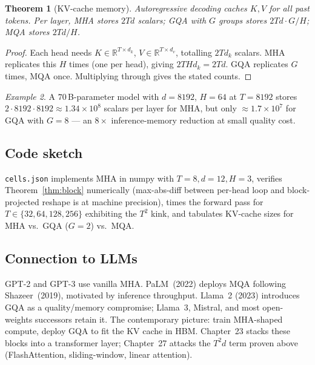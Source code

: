 \documentclass[11pt]{article}
\newtheorem{theorem}{Theorem}[section]
\theoremstyle{remark}
\newtheorem{example}[theorem]{Example}
\begin{document}
\begin{theorem}[KV-cache memory]
\label{thm:kvcache}
Autoregressive decoding caches $K, V$ for all past tokens. Per layer, MHA stores $2 T d$ scalars; GQA with $G$ groups stores $2 T d \cdot G/H$; MQA stores $2 T d / H$.
\end{theorem}
\begin{proof}
Each head needs $K \in \mathbb{R}^{T \times d_k}$, $V \in \mathbb{R}^{T \times d_v}$, totalling $2 T d_k$ scalars. MHA replicates this $H$ times (one per head), giving $2 T H d_k = 2 T d$. GQA replicates $G$ times, MQA once. Multiplying through gives the stated counts.
\end{proof}

\begin{example}
A $70$\,B-parameter model with $d = 8192$, $H = 64$ at $T = 8192$ stores $2 \cdot 8192 \cdot 8192 \approx 1.34 \times 10^{8}$ scalars per layer for MHA, but only $\approx 1.7 \times 10^{7}$ for GQA with $G = 8$ --- an $8\times$ inference-memory reduction at small quality cost.
\end{example}

\subsection*{Code sketch}

\texttt{cells.json} implements MHA in numpy with $T = 8, d = 12, H = 3$, verifies Theorem~\ref{thm:block} numerically (max-abs-diff between per-head loop and block-projected reshape is at machine precision), times the forward pass for $T \in \{32, 64, 128, 256\}$ exhibiting the $T^2$ kink, and tabulates KV-cache sizes for MHA vs.\ GQA ($G = 2$) vs.\ MQA.

\subsection*{Connection to LLMs}

GPT-2 and GPT-3 use vanilla MHA. PaLM~(2022) deploys MQA following Shazeer~(2019), motivated by inference throughput. Llama~2 (2023) introduces GQA as a quality/memory compromise; Llama~3, Mistral, and most open-weights successors retain it. The contemporary picture: train MHA-shaped compute, deploy GQA to fit the KV cache in HBM. Chapter~23 stacks these blocks into a transformer layer; Chapter~27 attacks the $T^2 d$ term proven above (FlashAttention, sliding-window, linear attention).

\end{document}
